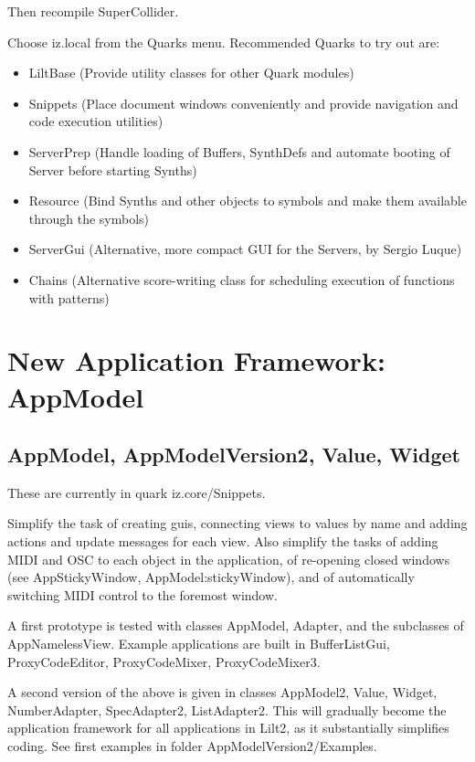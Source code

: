 \documentclass[11pt, a4paper]{scrartcl}
\begin{document}
Then recompile SuperCollider. 

Choose iz.local from the Quarks menu.  Recommended Quarks to try out are: 

\begin{itemize}
\item LiltBase (Provide utility classes for other Quark modules)
\item Snippets (Place document windows conveniently and provide navigation and code execution utilities)
\item ServerPrep (Handle loading of Buffers, SynthDefs and automate booting of Server before starting Synths)
\item Resource (Bind Synths and other objects to symbols and make them available through the symbols)
\item ServerGui (Alternative, more compact GUI for the Servers, by Sergio Luque)
\item Chains (Alternative score-writing class for scheduling execution of functions with patterns)
\end{itemize}
\section*{New Application Framework: AppModel}
\label{sec-6}
\subsection*{AppModel, AppModelVersion2, Value, Widget}
\label{sec-6_1}


These are currently in quark iz.core/Snippets. 

Simplify the task of creating guis, connecting views to values by name and adding actions and update messages for each view.  Also simplify the tasks of adding MIDI and OSC to each object in the application, of re-opening closed windows (see AppStickyWindow, AppModel:stickyWindow), and of automatically switching MIDI control to the foremost window. 

A first prototype is tested with classes AppModel, Adapter, and the subclasses of AppNamelessView.  Example applications are built in BufferListGui, ProxyCodeEditor, ProxyCodeMixer, ProxyCodeMixer3.

A second version of the above is given in classes AppModel2, Value, Widget, NumberAdapter, SpecAdapter2, ListAdapter2. This will gradually become the application framework for all applications in Lilt2, as it substantially simplifies coding. See first examples in folder AppModelVersion2/Examples. 
\end{document}
